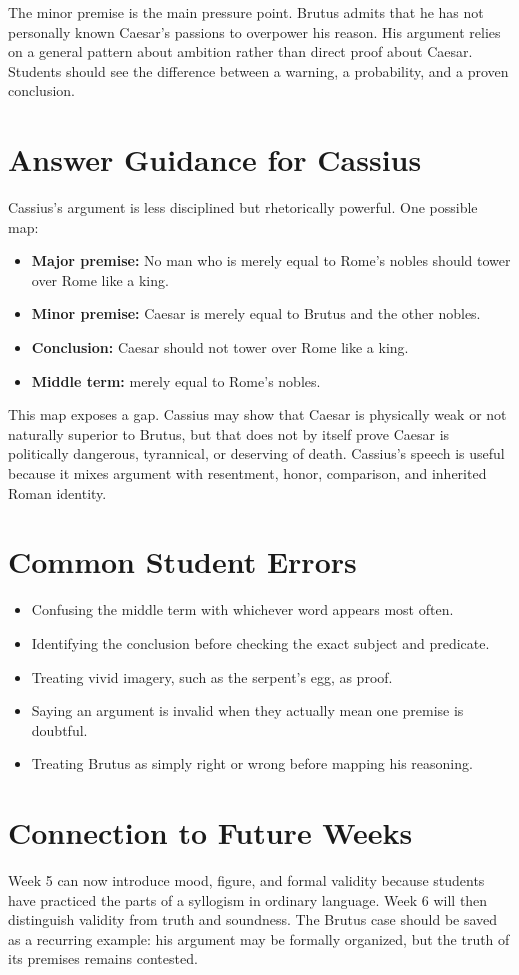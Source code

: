 \documentclass[12pt]{article}
\begin{document}
The minor premise is the main pressure point. Brutus admits that he has not personally known Caesar's passions to overpower his reason. His argument relies on a general pattern about ambition rather than direct proof about Caesar. Students should see the difference between a warning, a probability, and a proven conclusion.

\section*{Answer Guidance for Cassius}
Cassius's argument is less disciplined but rhetorically powerful. One possible map:
\begin{itemize}[leftmargin=*]
\item \textbf{Major premise:} No man who is merely equal to Rome's nobles should tower over Rome like a king.
\item \textbf{Minor premise:} Caesar is merely equal to Brutus and the other nobles.
\item \textbf{Conclusion:} Caesar should not tower over Rome like a king.
\item \textbf{Middle term:} merely equal to Rome's nobles.
\end{itemize}

This map exposes a gap. Cassius may show that Caesar is physically weak or not naturally superior to Brutus, but that does not by itself prove Caesar is politically dangerous, tyrannical, or deserving of death. Cassius's speech is useful because it mixes argument with resentment, honor, comparison, and inherited Roman identity.

\section*{Common Student Errors}
\begin{itemize}[leftmargin=*]
\item Confusing the middle term with whichever word appears most often.
\item Identifying the conclusion before checking the exact subject and predicate.
\item Treating vivid imagery, such as the serpent's egg, as proof.
\item Saying an argument is invalid when they actually mean one premise is doubtful.
\item Treating Brutus as simply right or wrong before mapping his reasoning.
\end{itemize}

\section*{Connection to Future Weeks}
Week 5 can now introduce mood, figure, and formal validity because students have practiced the parts of a syllogism in ordinary language. Week 6 will then distinguish validity from truth and soundness. The Brutus case should be saved as a recurring example: his argument may be formally organized, but the truth of its premises remains contested.
\end{document}
